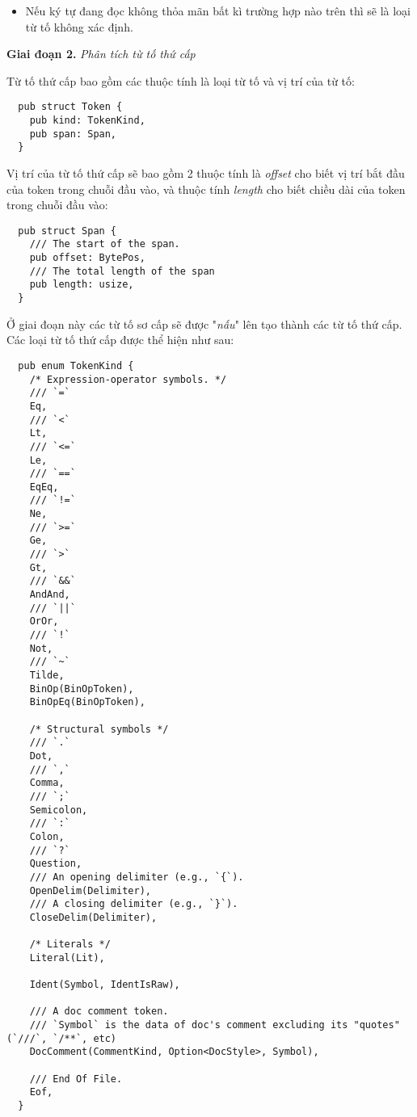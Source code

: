 \begin{itemize}

  \item Nếu ký tự đang đọc không thỏa mãn bất kì trường hợp nào trên thì sẽ là loại từ tố không xác định.
\end{itemize}


\textbf{Giai đoạn 2.} \textit{Phân tích từ tố thứ cấp}

Từ tố thứ cấp bao gồm các thuộc tính là loại từ tố và vị trí của từ tố:
\begin{lstlisting}
  pub struct Token {
    pub kind: TokenKind,
    pub span: Span,
  }
\end{lstlisting}

Vị trí của từ tố thứ cấp sẽ bao gồm 2 thuộc tính là \textit{offset} cho biết vị trí bắt đầu của token trong chuỗi đầu vào, và thuộc tính \textit{length} cho biết chiều dài của token trong chuỗi đầu vào:
\begin{lstlisting}
  pub struct Span {
    /// The start of the span.
    pub offset: BytePos,
    /// The total length of the span
    pub length: usize,
  }
\end{lstlisting}

Ở giai đoạn này các từ tố sơ cấp sẽ được "\textit{nấu}" lên tạo thành các từ tố thứ cấp. Các loại từ tố thứ cấp được thể hiện như sau:
\begin{lstlisting}
  pub enum TokenKind {
    /* Expression-operator symbols. */
    /// `=`
    Eq,
    /// `<`
    Lt,
    /// `<=`
    Le,
    /// `==`
    EqEq,
    /// `!=`
    Ne,
    /// `>=`
    Ge,
    /// `>`
    Gt,
    /// `&&`
    AndAnd,
    /// `||`
    OrOr,
    /// `!`
    Not,
    /// `~`
    Tilde,
    BinOp(BinOpToken),
    BinOpEq(BinOpToken),

    /* Structural symbols */
    /// `.`
    Dot,
    /// `,`
    Comma,
    /// `;`
    Semicolon,
    /// `:`
    Colon,
    /// `?`
    Question,
    /// An opening delimiter (e.g., `{`).
    OpenDelim(Delimiter),
    /// A closing delimiter (e.g., `}`).
    CloseDelim(Delimiter),

    /* Literals */
    Literal(Lit),

    Ident(Symbol, IdentIsRaw),

    /// A doc comment token.
    /// `Symbol` is the data of doc's comment excluding its "quotes" (`///`, `/**`, etc)
    DocComment(CommentKind, Option<DocStyle>, Symbol),

    /// End Of File.
    Eof,
  }
\end{lstlisting} 

